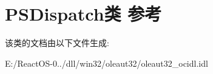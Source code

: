 \hypertarget{class_p_s_dispatch}{}\section{P\+S\+Dispatch类 参考}
\label{class_p_s_dispatch}


该类的文档由以下文件生成\+:\begin{DoxyCompactItemize}
\item 
E\+:/\+React\+O\+S-\/0../dll/win32/oleaut32/oleaut32\+\_\+ocidl.\+idl\end{DoxyCompactItemize}
